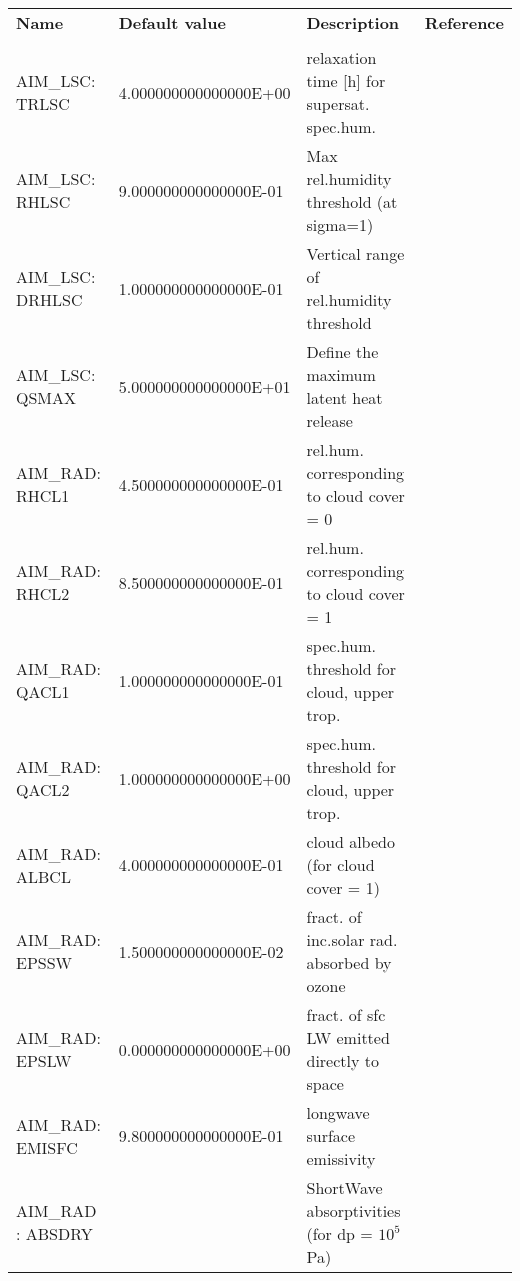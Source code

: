 \newpage
\begin{table}
\hspace*{-1.5in}
\begin{tabular}{lllc}
  \textbf{Name}  &  \textbf{Default value}  
    &  \textbf{Description}   &  \textbf{Reference}  \\
  & & & \\
   AIM\_LSC:  TRLSC   &                   4.000000000000000E+00
    &   relaxation time [h] for supersat. spec.hum. 
    &  %
    \\
   AIM\_LSC:  RHLSC   &                   9.000000000000000E-01
    &   Max rel.humidity threshold (at sigma=1) 
    &  %
    \\
   AIM\_LSC: DRHLSC   &                   1.000000000000000E-01
    &   Vertical range of rel.humidity threshold 
    &  %
    \\
   AIM\_LSC:  QSMAX   &                   5.000000000000000E+01
    &   Define the maximum latent heat release 
    &  %
    \\
   AIM\_RAD:  RHCL1   &                   4.500000000000000E-01
    &    rel.hum. corresponding to cloud cover = 0 
    &  %
    \\
   AIM\_RAD:  RHCL2   &                   8.500000000000000E-01
    &    rel.hum. corresponding to cloud cover = 1 
    &  %
    \\
   AIM\_RAD:  QACL1   &                   1.000000000000000E-01
    &   spec.hum. threshold for cloud, upper trop. 
    &  %
    \\
   AIM\_RAD:  QACL2   &                   1.000000000000000E+00
    &   spec.hum. threshold for cloud, upper trop. 
    &  %
    \\
   AIM\_RAD:  ALBCL   &                   4.000000000000000E-01
    &    cloud albedo (for cloud cover = 1) 
    &  %
    \\
   AIM\_RAD:  EPSSW   &                   1.500000000000000E-02
    &    fract. of inc.solar rad. absorbed by ozone 
    &  %
    \\
   AIM\_RAD:  EPSLW   &                   0.000000000000000E+00
    &    fract. of sfc LW emitted directly to space 
    &  %
    \\
   AIM\_RAD: EMISFC   &                   9.800000000000000E-01
    &    longwave surface emissivity 
    &  %
    \\
    AIM\_RAD : ABSDRY &
    &    ShortWave absorptivities (for dp = $10^5$ Pa)
    &  %

\end{tabular}
\end{table}
